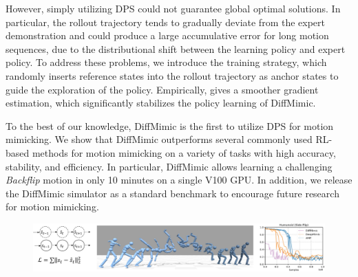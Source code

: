 However, simply utilizing DPS could not guarantee global optimal solutions.
In particular, the rollout trajectory tends to gradually deviate from the expert demonstration and could produce a large accumulative error for long motion sequences, due to the distributional shift between the learning policy and expert policy.
To address these problems, we introduce the \textit{\ourmethod{}} training strategy, which randomly inserts reference states into the rollout trajectory as anchor states to guide the exploration of the policy. 
Empirically, \ourmethod{} gives a smoother gradient estimation, which significantly stabilizes the policy learning of DiffMimic.


To the best of our knowledge, DiffMimic is the first to utilize DPS for motion mimicking. We show that DiffMimic outperforms several commonly used RL-based methods for motion mimicking on a variety of tasks with high accuracy, stability, and efficiency. In particular, DiffMimic allows learning a challenging \textit{Backflip} motion in only 10 minutes on a single V100 GPU.
In addition, we release the DiffMimic simulator as a standard benchmark to encourage future research for motion mimicking.

\begin{figure}[t]
    \centering
    \includegraphics[width=\textwidth]{figures/teaser.pdf}
    \label{fig:teaser}
\end{figure}